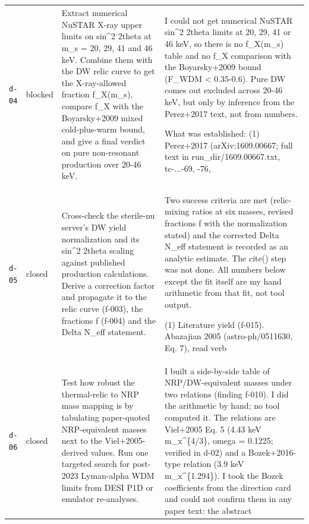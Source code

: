\documentclass[11pt,a4paper]{article}
\begin{document}
\begin{longtable}{@{}p{}p{}p{}p{}@{}}
\texttt{d-04} & blocked & Extract numerical NuSTAR X-ray upper limits on sin\textasciicircum{}2 2theta at m\_s = 20, 29, 41 and 46 keV. Combine them with the DW relic curve to get the X-ray-allowed fraction f\_X(m\_s), compare f\_X with the Boyarsky+2009 mixed cold-plus-warm bound, and give a final verdict on pure non-resonant production over 20-46 keV. & I could not get numerical NuSTAR sin\textasciicircum{}2 2theta limits at 20, 29, 41 or 46 keV, so there is no f\_X(m\_s) table and no f\_X comparison with the Boyarsky+2009 bound (F\_WDM \textless{} 0.35-0.6). Pure DW comes out excluded across 20-46 keV, but only by inference from the Perez+2017 text, not from numbers.

What was established:
(1) Perez+2017 (arXiv:1609.00667; full text in run\_dir/1609.00667.txt, tc-...-69, -76,  \\
\texttt{d-05} & closed & Cross-check the sterile-nu server's DW yield normalization and its sin\textasciicircum{}2 2theta scaling against published production calculations. Derive a correction factor and propagate it to the relic curve (f-003), the fractions f (f-004) and the Delta N\_eff statement. & Two success criteria are met (relic-mixing ratios at six masses, revised fractions f with the normalization stated) and the corrected Delta N\_eff statement is recorded as an analytic estimate. The cite() step was not done. All numbers below except the fit itself are my hand arithmetic from that fit, not tool output.

(1) Literature yield (f-015). Abazajian 2005 (astro-ph/0511630, Eq. 7), read verb \\
\texttt{d-06} & closed & Test how robust the thermal-relic to NRP mass mapping is by tabulating paper-quoted NRP-equivalent masses next to the Viel+2005-derived values. Run one targeted search for post-2023 Lyman-alpha WDM limits from DESI P1D or emulator re-analyses. & I built a side-by-side table of NRP/DW-equivalent masses under two relations (finding f-010). I did the arithmetic by hand; no tool computed it. The relations are Viel+2005 Eq. 5 (4.43 keV m\_x\textasciicircum{}\{4/3\}, omega = 0.1225; verified in d-02) and a Bozek+2016-type relation (3.9 keV m\_x\textasciicircum{}\{1.294\}). I took the Bozek coefficients from the direction card and could not confirm them in any paper text: the abstract \\
\bottomrule\end{longtable}
\end{document}
